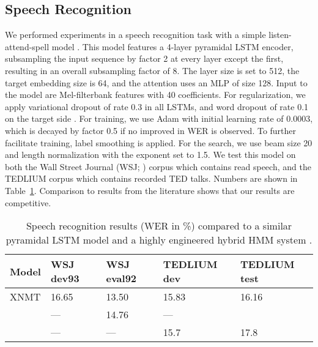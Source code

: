 \documentclass[]{article}
\begin{document}
\subsection{Speech Recognition}
\label{sec:expasr}
We performed experiments in a speech recognition task with a simple listen-attend-spell model \citep{chan2016listen}. This model features a 4-layer pyramidal LSTM encoder, subsampling the input sequence by factor 2 at every layer except the first, resulting in an overall subsampling factor of 8. The layer size is set to 512, the target embedding size is 64, and the attention uses an MLP of size 128. Input to the model are Mel-filterbank features with 40 coefficients. For regularization, we apply variational dropout of rate 0.3 in all LSTMs, and word dropout of rate 0.1 on the target side \citep{gal2016theoretically}. For training, we use Adam \citep{kingma2014adam} with initial learning rate of 0.0003, which is decayed by factor 0.5 if no improved in WER is observed. To further facilitate training, label smoothing \citep{szegedy2016rethinking} is applied. For the search, we use beam size 20 and length normalization with the exponent set to 1.5. We test this model on both the Wall Street Journal (WSJ; \citet{paul1992design}) corpus which contains read speech, and the TEDLIUM corpus \citep{rousseau2014enhancing} which contains recorded TED talks. Numbers are shown in Table~\ref{tab:asr_results}. Comparison to results from the literature shows that our results are competitive.
\begin{table}[tb]
\centering
\label{tab:asr_results}
\begin{tabular}{lllll}
Model                           & WSJ dev93 & WSJ eval92 & TEDLIUM dev & TEDLIUM test \\
\hline
XNMT                            & 16.65     & 13.50       & 15.83 & 16.16       \\
\citet{zhang2017very}           & ---       & 14.76      & ---   &       \\
\citet{rousseau2014enhancing}   & ---       & ---        & 15.7  & 17.8
\end{tabular}
\caption{Speech recognition results (WER in \%) compared to a similar pyramidal LSTM model \citep{zhang2017very} and a highly engineered hybrid HMM system \citep{rousseau2014enhancing}.}
\end{table}
\end{document}
